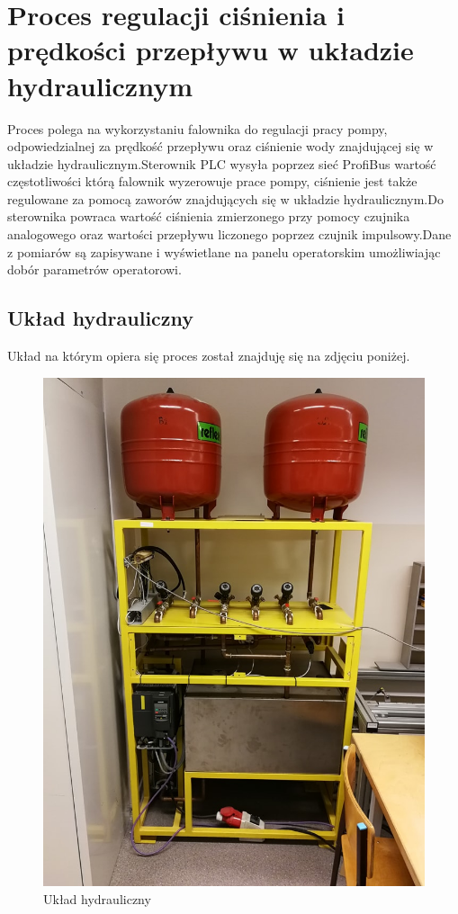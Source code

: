 \section{Proces regulacji ciśnienia i prędkości przepływu w układzie hydraulicznym}
Proces polega na wykorzystaniu falownika do regulacji pracy pompy, odpowiedzialnej za prędkość przepływu oraz ciśnienie wody znajdującej się w układzie hydraulicznym.Sterownik PLC wysyła poprzez sieć ProfiBus wartość częstotliwości którą falownik wyzerowuje prace pompy, ciśnienie jest także regulowane za pomocą zaworów znajdujących się w układzie hydraulicznym.Do sterownika powraca wartość ciśnienia zmierzonego przy pomocy czujnika analogowego oraz wartości przepływu liczonego poprzez czujnik impulsowy.Dane z pomiarów są zapisywane i wyświetlane na panelu operatorskim umożliwiając dobór parametrów operatorowi.
\newpage
\subsection{Układ hydrauliczny}
Układ na którym opiera się proces został znajduję się na zdjęciu poniżej.
\begin{figure}[h]
\centering
\includegraphics[scale=0.3]{Zdjecia/Stanowiska/4_Pompa/uklad_h.jpg}
\caption{Układ hydrauliczny}
\end{figure}

